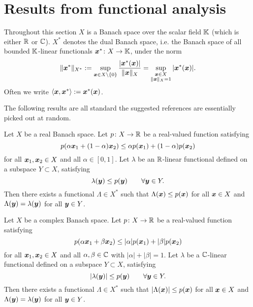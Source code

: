 \section{Results from functional analysis}

Throughout this section $X$ is a Banach space over the scalar field $\mathbb{K}$ (which is either $\mathbb{R}$ or $\mathbb{C}$).
$X^*$ denotes the dual Banach space, i.e. the Banach space of all bounded $\mathbb{K}$-linear functionals $\bm{x}^* \colon X \rightarrow \mathbb{K}$, under the norm
\begin{equation*}
  \|\bm{x}^*\|_{X^*} := \sup_{\bm{x} \in X \setminus \{0\}} \frac{|\bm{x}^*(\bm{x})|}{\|\bm{x}\|_{X}} = \sup_{\substack{\bm{x} \in X \\ \|\bm{x}\|_{X} = 1}} |\bm{x}^*(\bm{x})|.
\end{equation*}
Often we write $\langle \bm{x}, \bm{x}^* \rangle := \bm{x}^*(\bm{x})$.

The following results are all standard the suggested references are essentially picked out at random.

\cite[Section III.3]{RS80}

\begin{thm}
  Let $X$ be a real Banach space.
  Let $p \colon X \rightarrow \mathbb{R}$ be a real-valued function satisfying
  \begin{equation*}
    p(\alpha \bm{x}_1 + (1-\alpha) \bm{x}_2) \leq \alpha p(\bm{x}_1) + (1-\alpha)p(\bm{x}_2)
  \end{equation*}
  for all $\bm{x}_1, \bm{x}_2 \in X$ and all $\alpha \in  [0,1]$.
  Let $\lambda$ be an $\mathbb{R}$-linear functional defined on a subspace $Y \subset X$, satisfying
  \begin{equation*}
    \lambda(\bm{y}) \leq p(\bm{y}) \qquad \forall \bm{y} \in Y.
  \end{equation*}
  Then there exists a functional $\Lambda \in X^*$ such that $\Lambda(\bm{x}) \leq p(\bm{x})$ for all $\bm{x} \in X$ and $\Lambda(\bm{y}) = \lambda(\bm{y})$ for all $\bm{y} \in Y$.
\end{thm}

\begin{thm}
  Let $X$ be a complex Banach space.
  Let $p \colon X \rightarrow \mathbb{R}$ be a real-valued function satisfying
  \begin{equation*}
    p(\alpha \bm{x}_1 + \beta \bm{x}_2) \leq |\alpha|p(\bm{x}_1) + |\beta|p(\bm{x}_2)
  \end{equation*}
  for all $\bm{x}_1, \bm{x}_2 \in X$ and all $\alpha,\beta \in \mathbb{C}$ with $|\alpha| + |\beta| = 1$.
  Let $\lambda$ be a $\mathbb{C}$-linear functional defined on a subspace $Y \subset X$, satisfying
  \begin{equation*}
    |\lambda(\bm{y})| \leq p(\bm{y}) \qquad \forall \bm{y} \in Y.
  \end{equation*}
  Then there exists a functional $\Lambda \in X^*$ such that $|\Lambda(\bm{x})| \leq p(\bm{x})$ for all $\bm{x} \in X$ and $\Lambda(\bm{y}) = \lambda(\bm{y})$ for all $\bm{y} \in Y$.
\end{thm}

